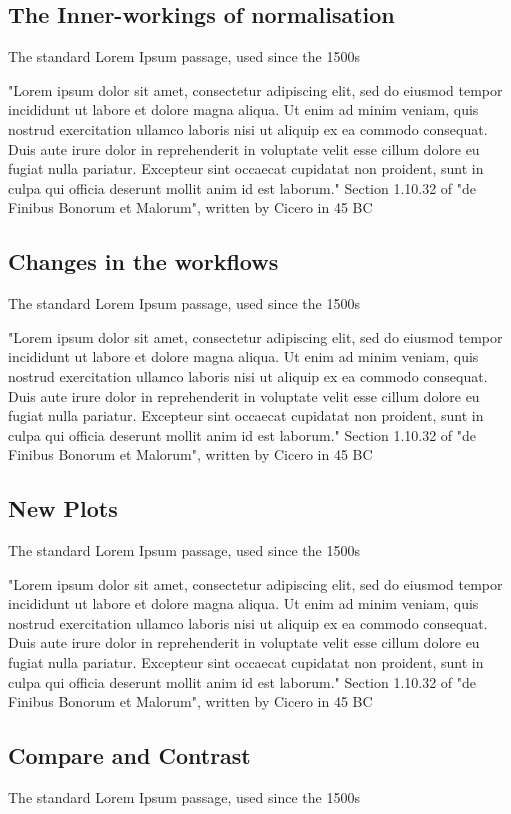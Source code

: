 \documentclass[11pt]{article}
\begin{document}
		\subsection*{The Inner-workings of normalisation}
			The standard Lorem Ipsum passage, used since the 1500s
			
			"Lorem ipsum dolor sit amet, consectetur adipiscing elit, sed do eiusmod tempor incididunt ut labore et dolore magna aliqua. Ut enim ad minim veniam, quis nostrud exercitation ullamco laboris nisi ut aliquip ex ea commodo consequat. Duis aute irure dolor in reprehenderit in voluptate velit esse cillum dolore eu fugiat nulla pariatur. Excepteur sint occaecat cupidatat non proident, sunt in culpa qui officia deserunt mollit anim id est laborum."
			Section 1.10.32 of "de Finibus Bonorum et Malorum", written by Cicero in 45 BC
		\subsection*{Changes in the workflows}
			The standard Lorem Ipsum passage, used since the 1500s
			
			"Lorem ipsum dolor sit amet, consectetur adipiscing elit, sed do eiusmod tempor incididunt ut labore et dolore magna aliqua. Ut enim ad minim veniam, quis nostrud exercitation ullamco laboris nisi ut aliquip ex ea commodo consequat. Duis aute irure dolor in reprehenderit in voluptate velit esse cillum dolore eu fugiat nulla pariatur. Excepteur sint occaecat cupidatat non proident, sunt in culpa qui officia deserunt mollit anim id est laborum."
			Section 1.10.32 of "de Finibus Bonorum et Malorum", written by Cicero in 45 BC
		\subsection*{New Plots}
			The standard Lorem Ipsum passage, used since the 1500s
			
			"Lorem ipsum dolor sit amet, consectetur adipiscing elit, sed do eiusmod tempor incididunt ut labore et dolore magna aliqua. Ut enim ad minim veniam, quis nostrud exercitation ullamco laboris nisi ut aliquip ex ea commodo consequat. Duis aute irure dolor in reprehenderit in voluptate velit esse cillum dolore eu fugiat nulla pariatur. Excepteur sint occaecat cupidatat non proident, sunt in culpa qui officia deserunt mollit anim id est laborum."
			Section 1.10.32 of "de Finibus Bonorum et Malorum", written by Cicero in 45 BC
		\subsection*{Compare and Contrast}
			The standard Lorem Ipsum passage, used since the 1500s
			
\end{document}
